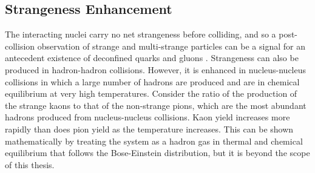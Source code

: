 \subsection{Strangeness Enhancement}
The interacting nuclei carry no net strangeness before colliding, and so a post-collision observation of strange and multi-strange particles can be a signal for an antecedent existence of deconfined quarks and gluons \cite{1742-6596-455-1-012005}. Strangeness can also be produced in hadron-hadron collisions. However, it is enhanced in nucleus-nucleus collisions in which a large number of hadrons are produced and are in chemical equilibrium at very high temperatures. Consider the ratio of the production of the strange kaons to that of the non-strange pions, which are the most abundant hadrons produced from nucleus-nucleus collisions. Kaon yield increases more rapidly than does pion yield as the temperature increases. This can be shown mathematically by treating the system as a hadron gas in thermal and chemical equilibrium that follows the Bose-Einstein distribution, but it is beyond the scope of this thesis.\cite{wong1994introduction}

